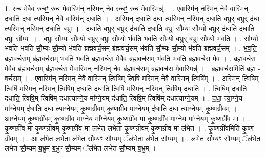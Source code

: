 \documentclass[17pt]{extarticle}
\begin{document}
1. रुच॑ मे॒वैव रुचꣳ॒॒ रुच॑ मे॒वास्मि॑न् नस्मिन् ने॒व रुचꣳ॒॒ रुच॑ मे॒वास्मिन्न्॑ । . ए॒वास्मि॑न् नस्मिन् ने॒वै वास्मि॑न् दधाति दधा त्यस्मिन् ने॒वै वास्मि॑न् दधाति । . अ॒स्मि॒न् द॒धा॒ति॒ द॒धा॒ त्य॒स्मि॒न् न॒स्मि॒न् द॒धा॒ति॒ ब॒भ्रुर् ब॒भ्रुर् द॑धा त्यस्मिन् नस्मिन् दधाति ब॒भ्रुः । . द॒धा॒ति॒ ब॒भ्रुर् ब॒भ्रुर् द॑धाति दधाति ब॒भ्रुः सौ॒म्यः सौ॒म्यो ब॒भ्रुर् द॑धाति दधाति ब॒भ्रुः सौ॒म्यः । . ब॒भ्रुः सौ॒म्यः सौ॒म्यो ब॒भ्रुर् ब॒भ्रुः सौ॒म्यो भ॑वति भवति सौ॒म्यो ब॒भ्रुर् ब॒भ्रुः सौ॒म्यो भ॑वति । . सौ॒म्यो भ॑वति भवति सौ॒म्यः सौ॒म्यो भ॑वति ब्रह्मवर्च॒सम् ब्र॑ह्मवर्च॒सम् भ॑वति सौ॒म्यः सौ॒म्यो भ॑वति ब्रह्मवर्च॒सम् । . भ॒व॒ति॒ ब्र॒ह्म॒व॒र्च॒सम् ब्र॑ह्मवर्च॒सम् भ॑वति भवति ब्रह्मवर्च॒स मे॒वैव ब्र॑ह्मवर्च॒सम् भ॑वति भवति ब्रह्मवर्च॒स मे॒व । . ब्र॒ह्म॒व॒र्च॒स मे॒वैव ब्र॑ह्मवर्च॒सम् ब्र॑ह्मवर्च॒स मे॒वास्मि॑न् नस्मिन् ने॒व ब्र॑ह्मवर्च॒सम् ब्र॑ह्मवर्च॒स मे॒वास्मिन्न्॑ । . ब्र॒ह्म॒व॒र्च॒समिति॑ ब्रह्म - व॒र्च॒सम् । . ए॒वास्मि॑न् नस्मिन् ने॒वै वास्मि॒न् त्विषि॒म् त्विषि॑ मस्मिन् ने॒वै वास्मि॒न् त्विषि᳚म् । . अ॒स्मि॒न् त्विषि॒म् त्विषि॑ मस्मिन् नस्मि॒न् त्विषि॑म् दधाति दधाति॒ त्विषि॑ मस्मिन् नस्मि॒न् त्विषि॑म् दधाति । . त्विषि॑म् दधाति दधाति॒ त्विषि॒म् त्विषि॑म् दधात्याग्ने॒य मा᳚ग्ने॒यम् द॑धाति॒ त्विषि॒म् त्विषि॑म् दधात्याग्ने॒यम् । . द॒धा॒ त्या॒ग्ने॒य मा᳚ग्ने॒यम् द॑धाति दधा त्याग्ने॒यम् कृ॒ष्णग्री॑वम् कृ॒ष्णग्री॑व माग्ने॒यम् द॑धाति दधा त्याग्ने॒यम् कृ॒ष्णग्री॑वम् । . आ॒ग्ने॒यम् कृ॒ष्णग्री॑वम् कृ॒ष्णग्री॑व माग्ने॒य मा᳚ग्ने॒यम् कृ॒ष्णग्री॑व॒ मा कृ॒ष्णग्री॑व माग्ने॒य मा᳚ग्ने॒यम् कृ॒ष्णग्री॑व॒ मा । . कृ॒ष्णग्री॑व॒ मा कृ॒ष्णग्री॑वम् कृ॒ष्णग्री॑व॒ मा ल॑भेत लभे॒ता कृ॒ष्णग्री॑वम् कृ॒ष्णग्री॑व॒ मा ल॑भेत । . कृ॒ष्णग्री॑व॒मिति॑ कृ॒ष्ण - ग्री॒व॒म् । . आ ल॑भेत लभे॒ता ल॑भेत सौ॒म्यꣳ सौ॒म्यम् ॅल॑भे॒ता ल॑भेत सौ॒म्यम् । . ल॒भे॒त॒ सौ॒म्यꣳ सौ॒म्यम् ॅल॑भेत लभेत सौ॒म्यम् ब॒भ्रुम् ब॒भ्रुꣳ सौ॒म्यम् ॅल॑भेत लभेत सौ॒म्यम् ब॒भ्रुम् । \newline
\end{document}
